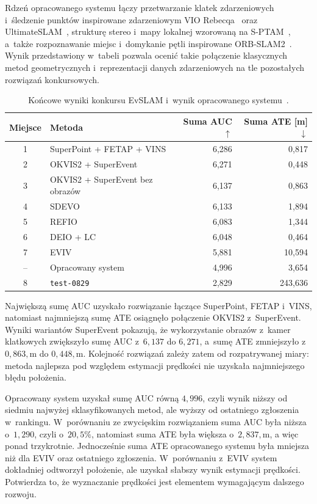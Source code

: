 \newpage

Rdzeń opracowanego systemu łączy przetwarzanie klatek zdarzeniowych i~śledzenie punktów inspirowane zdarzeniowym VIO Rebecqa~\cite{rebecq2017eventvio} oraz UltimateSLAM~\cite{vidal2018ultimate}, strukturę stereo i~mapy lokalnej wzorowaną na S-PTAM~\cite{pire2017sptam}, a~także rozpoznawanie miejsc i~domykanie pętli inspirowane ORB-SLAM2~\cite{murartal2017orbslam2}. Wynik przedstawiony w~tabeli pozwala ocenić takie połączenie klasycznych metod geometrycznych i~reprezentacji
danych zdarzeniowych na tle pozostałych rozwiązań konkursowych.

\begin{table}[!ht]
    \centering
    \small
    \caption{Końcowe wyniki konkursu EvSLAM i~wynik opracowanego systemu~\cite{evslam2025challenge}.}
    \label{tab:evslam_competition_results}
    \begin{tabularx}{0.82\textwidth}{c X r r}
        \toprule
        Miejsce & Metoda & Suma AUC $\uparrow$ & Suma ATE [m] $\downarrow$ \\
        \midrule
        1 & SuperPoint + FETAP + VINS & 6,286 & 0,817 \\
        2 & OKVIS2 + SuperEvent & 6,271 & 0,448 \\
        3 & OKVIS2 + SuperEvent bez obrazów & 6,137 & 0,863 \\
        4 & SDEVO & 6,133 & 1,894 \\
        5 & REFIO & 6,083 & 1,344 \\
        6 & DEIO + LC & 6,048 & 0,464 \\
        7 & EVIV & 5,881 & 10,594 \\
        -- & Opracowany system & 4,996 & 3,654 \\
        8 & \texttt{test-0829} & 2,829 & 243,636 \\
        \bottomrule
    \end{tabularx}
\end{table}

Największą sumę AUC uzyskało rozwiązanie łączące SuperPoint, FETAP i~VINS, natomiast najmniejszą sumę ATE osiągnęło połączenie OKVIS2 z~SuperEvent. Wyniki wariantów SuperEvent pokazują, że wykorzystanie obrazów z~kamer klatkowych zwiększyło sumę AUC z~$6{,}137$ do $6{,}271$, a~sumę ATE zmniejszyło z~$0{,}863,\mathrm{m}$ do $0{,}448,\mathrm{m}$. Kolejność rozwiązań zależy zatem od rozpatrywanej miary: metoda najlepsza pod względem estymacji prędkości nie uzyskała najmniejszego błędu położenia.

Opracowany system uzyskał sumę AUC równą $4{,}996$, czyli wynik niższy od siedmiu najwyżej sklasyfikowanych metod, ale wyższy od ostatniego zgłoszenia w~rankingu. W~porównaniu ze zwycięskim rozwiązaniem suma AUC była niższa o~$1{,}290$, czyli o~$20{,}5\%$, natomiast suma ATE była większa o~$2{,}837,\mathrm{m}$, a więc ponad trzykrotnie. Jednocześnie suma ATE opracowanego systemu była mniejsza niż dla EVIV oraz ostatniego zgłoszenia. W~porównaniu z~EVIV system dokładniej odtworzył położenie, ale uzyskał słabszy wynik estymacji prędkości. Potwierdza to, że wyznaczanie prędkości jest elementem wymagającym dalszego rozwoju.

